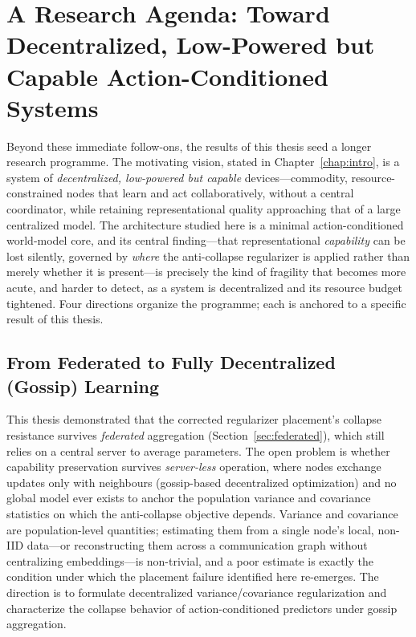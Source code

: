 \section{A Research Agenda: Toward Decentralized, Low-Powered but Capable
Action-Conditioned Systems}
\label{sec:agenda}
Beyond these immediate follow-ons, the results of this thesis seed a longer
research programme. The motivating vision, stated in
Chapter~\ref{chap:intro}, is a system of \emph{decentralized, low-powered but
capable} devices---commodity, resource-constrained nodes that learn and act
collaboratively, without a central coordinator, while retaining
representational quality approaching that of a large centralized model. The
architecture studied here is a minimal action-conditioned world-model core,
and its central finding---that representational \emph{capability} can be lost
silently, governed by \emph{where} the anti-collapse regularizer is applied
rather than merely whether it is present---is precisely the kind of fragility
that becomes more acute, and harder to detect, as a system is decentralized
and its resource budget tightened. Four directions organize the programme;
each is anchored to a specific result of this thesis.

\subsection{From Federated to Fully Decentralized (Gossip) Learning}
This thesis demonstrated that the corrected regularizer placement's collapse
resistance survives \emph{federated} aggregation (Section~\ref{sec:federated}),
which still relies on a central server to average parameters. The open problem
is whether capability preservation survives \emph{server-less} operation, where
nodes exchange updates only with neighbours (gossip-based decentralized
optimization) and no global model ever exists to anchor the population
variance and covariance statistics on which the anti-collapse objective
depends. Variance and covariance are population-level quantities; estimating
them from a single node's local, non-IID data---or reconstructing them across a
communication graph without centralizing embeddings---is non-trivial, and a
poor estimate is exactly the condition under which the placement failure
identified here re-emerges. The direction is to formulate decentralized
variance/covariance regularization and characterize the collapse behavior of
action-conditioned predictors under gossip aggregation.

